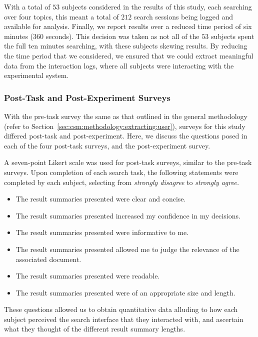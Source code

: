With a total of $53$ subjects considered in the results of this study, each searching over four topics, this meant a total of $212$ search sessions being logged and available for analysis. Finally, we report results over a reduced time period of six minutes ($360$ seconds). This decision was taken as not all of the $53$ subjects spent the full ten minutes searching, with these subjects skewing results. By reducing the time period that we considered, we ensured that we could extract meaningful data from the interaction logs, where all subjects were interacting with the experimental system.

\subsubsection{Post-Task and Post-Experiment Surveys}
With the pre-task survey the same as that outlined in the general methodology (refer to Section~\ref{sec:csm:methodology:extracting:user}), surveys for this study differed post-task and post-experiment. Here, we discuss the questions posed in each of the four post-task surveys, and the post-experiment survey.

A seven-point Likert scale was used for post-task surveys, similar to the pre-task surveys. Upon completion of each search task, the following statements were completed by each subject, selecting from \emph{strongly disagree} to \emph{strongly agree.}

\begin{itemize}
    \item{ The result summaries presented were clear and concise.}
    \item{ The result summaries presented increased my confidence in my decisions.}
    \item{ The result summaries presented were informative to me.}
    \item{ The result summaries presented allowed me to judge the relevance of the associated document.}
    \item{ The result summaries presented were readable.}
    \item{ The result summaries presented were of an appropriate size and length.}
\end{itemize}

These questions allowed us to obtain quantitative data alluding to how each subject perceived the search interface that they interacted with, and ascertain what they thought of the different result summary lengths.

